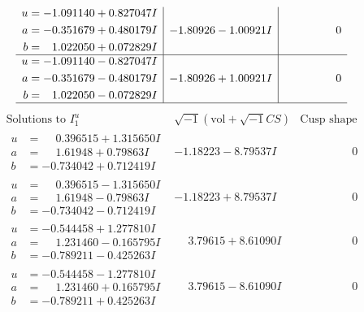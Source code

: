 \documentclass[1p]{elsarticle_modified}
\theoremstyle{definition}
\newcommand{\I}{\sqrt{-1}}
\begin{document}
$$\begin{array}{c|c|c}
\begin{aligned}
u &= -1.091140 + 0.827047 I \\
a &= -0.351679 + 0.480179 I \\
b &= \phantom{-}1.022050 + 0.072829 I\end{aligned}
 & -1.80926 - 1.00921 I & \phantom{-0.000000 } 0 \\ \hline\begin{aligned}
u &= -1.091140 - 0.827047 I \\
a &= -0.351679 - 0.480179 I \\
b &= \phantom{-}1.022050 - 0.072829 I\end{aligned}
 & -1.80926 + 1.00921 I & \phantom{-0.000000 } 0\\
 \hline 
 \end{array}$$\newpage$$\begin{array}{c|c|c}  
\text{Solutions to }I^u_{1}& \I (\text{vol} + \sqrt{-1}CS) & \text{Cusp shape}\\
 \hline 
\begin{aligned}
u &= \phantom{-}0.396515 + 1.315650 I \\
a &= \phantom{-}1.61948 + 0.79863 I \\
b &= -0.734042 + 0.712419 I\end{aligned}
 & -1.18223 - 8.79537 I & \phantom{-0.000000 } 0 \\ \hline\begin{aligned}
u &= \phantom{-}0.396515 - 1.315650 I \\
a &= \phantom{-}1.61948 - 0.79863 I \\
b &= -0.734042 - 0.712419 I\end{aligned}
 & -1.18223 + 8.79537 I & \phantom{-0.000000 } 0 \\ \hline\begin{aligned}
u &= -0.544458 + 1.277810 I \\
a &= \phantom{-}1.231460 - 0.165795 I \\
b &= -0.789211 - 0.425263 I\end{aligned}
 & \phantom{-}3.79615 + 8.61090 I & \phantom{-0.000000 } 0 \\ \hline\begin{aligned}
u &= -0.544458 - 1.277810 I \\
a &= \phantom{-}1.231460 + 0.165795 I \\
b &= -0.789211 + 0.425263 I\end{aligned}
 & \phantom{-}3.79615 - 8.61090 I & \phantom{-0.000000 } 0 \\ \hline\begin{aligned}

\end{aligned}
\end{array}$$
\end{document}
